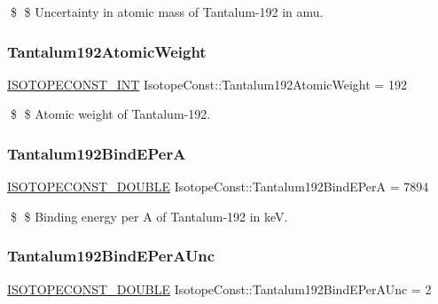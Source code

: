 \$ \$ Uncertainty in atomic mass of Tantalum-\/192 in amu. \mbox{\label{group___isotope_const-_tantalum-_ta192_ga79e75f4b5f65839b4823e83082b0ab4f}} 
\subsubsection{\texorpdfstring{Tantalum192\+Atomic\+Weight}{Tantalum192AtomicWeight}}
{\footnotesize\ttfamily \mbox{\hyperlink{group___isotope_const-_macros_ga5f18360b3e99483a35c32d789e62621c}{I\+S\+O\+T\+O\+P\+E\+C\+O\+N\+S\+T\+\_\+\+I\+NT}} Isotope\+Const\+::\+Tantalum192\+Atomic\+Weight = 192}

\$ \$ Atomic weight of Tantalum-\/192. \mbox{\label{group___isotope_const-_tantalum-_ta192_ga763e4804f300a2e2227cff0c1ea5e47c}} 
\subsubsection{\texorpdfstring{Tantalum192\+Bind\+E\+PerA}{Tantalum192BindEPerA}}
{\footnotesize\ttfamily \mbox{\hyperlink{group___isotope_const-_macros_ga8f45a7272ce02c0b4c65c44636ed719a}{I\+S\+O\+T\+O\+P\+E\+C\+O\+N\+S\+T\+\_\+\+D\+O\+U\+B\+LE}} Isotope\+Const\+::\+Tantalum192\+Bind\+E\+PerA = 7894}

\$ \$ Binding energy per A of Tantalum-\/192 in keV. \mbox{\label{group___isotope_const-_tantalum-_ta192_ga9a779f91fd2d7d3862504957bae680e3}} 
\subsubsection{\texorpdfstring{Tantalum192\+Bind\+E\+Per\+A\+Unc}{Tantalum192BindEPerAUnc}}
{\footnotesize\ttfamily \mbox{\hyperlink{group___isotope_const-_macros_ga8f45a7272ce02c0b4c65c44636ed719a}{I\+S\+O\+T\+O\+P\+E\+C\+O\+N\+S\+T\+\_\+\+D\+O\+U\+B\+LE}} Isotope\+Const\+::\+Tantalum192\+Bind\+E\+Per\+A\+Unc = 2}

